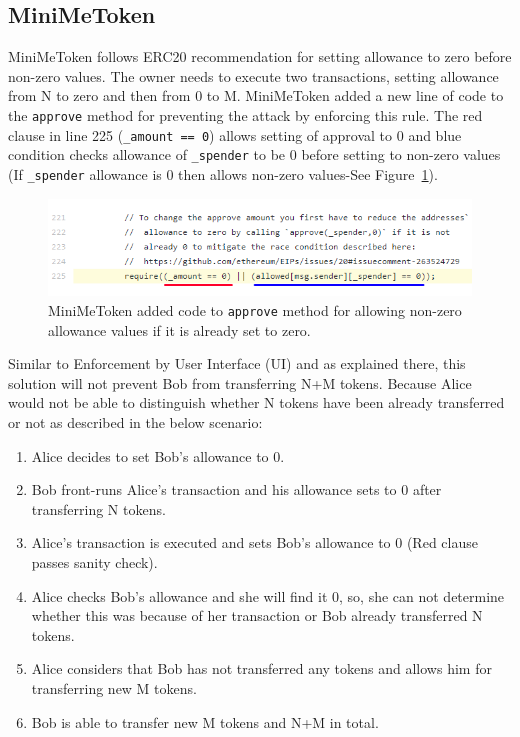 \subsection{MiniMeToken}
MiniMeToken\cite{Ref15} follows ERC20 recommendation for setting allowance to zero before non-zero values. The owner needs to execute two transactions, setting allowance from N to zero and then from 0 to M. MiniMeToken added a new line of code to the \texttt{approve} method for preventing the attack by enforcing this rule. The red clause in line 225 (\texttt{\_amount == 0}) allows setting of approval to 0 and blue condition checks allowance of \texttt{\_spender} to be 0 before setting to non-zero values (\ie If \texttt{\_spender} allowance is 0 then allows non-zero values-See Figure~\ref{fig:mini}).
\begin{figure}[t]
	\centering
	\includegraphics[width=1.0\linewidth]{figures/multiple_withdrawal_06.png}
	\caption{MiniMeToken added code to \texttt{approve} method for allowing non-zero allowance values if it is already set to zero.\label{fig:mini}}
\end{figure}

\noindent Similar to \textsf{Enforcement by User Interface (UI)} and as explained there, this solution will not prevent Bob from transferring N+M tokens. Because Alice would not be able to distinguish whether N tokens have been already transferred or not as described in the below scenario:
\begin{enumerate}
	\item Alice decides to set Bob’s allowance to 0.
	\item Bob front-runs Alice’s transaction and his allowance sets to 0 after transferring N tokens.
	\item Alice’s transaction is executed and sets Bob’s allowance to 0 (Red clause passes sanity check).
	\item Alice checks Bob’s allowance and she will find it 0, so, she can not determine whether this was because of her transaction or Bob already transferred N tokens.
	\item Alice considers that Bob has not transferred any tokens and allows him for transferring new M tokens.
	\item Bob is able to transfer new M tokens and N+M in total.
\end{enumerate}

